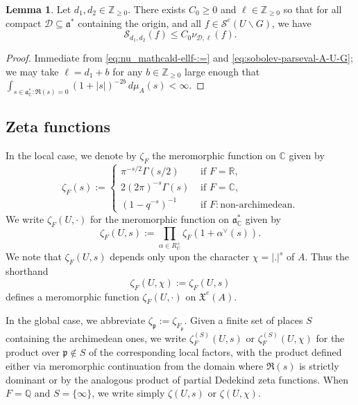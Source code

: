 \documentclass[reqno]{amsart}
\theoremstyle{plain} \newtheorem{theorem} {Theorem}
\theoremstyle{definition} \newtheorem{definition} [theorem] {Definition}
\theoremstyle{itplain} %
\newtheorem{lemma}[theorem]{Lemma}
\numberwithin{equation}{section}
\numberwithin{theorem}{section}
\renewcommand{\geq}{\geqslant}
\renewcommand{\leq}{\leqslant}
\begin{document}
\begin{lemma}\label{lem:standard2:let-d_1-d_2}
  Let $d_1, d_2 \in \mathbb{Z}_{\geq 0}$.  There exists $C_0 \geq 0$ and $\ell \in \mathbb{Z}_{\geq 0}$ so that for all compact $\mathcal{D} \subseteq \mathfrak{a}^*$ containing the origin, and all $f \in \mathcal{S}^e(U \backslash G)$, we have
  \begin{equation*}
    \mathcal{S}_{d_1,d_2}(f) \leq C_0 \nu_{\mathcal{D},\ell}(f).
  \end{equation*}
\end{lemma}
\begin{proof}
  Immediate from \eqref{eq:nu_mathcald-ellf-:=} and \eqref{eq:sobolev-parseval-A-U-G}; we may take $\ell = d_1 + b$ for any $b \in \mathbb{Z}_{\geq 0}$ large enough that $\int _{s \in \mathfrak{a}_{\mathbb{C}}^* : \Re(s) = 0} (1 + |s|)^{-2 b} \, d \mu_A(s) < \infty$.
\end{proof}


\subsection{Zeta functions}\label{sec:local-zeta-functions}
In the local case, we denote by $\zeta_F$ the meromorphic function on $\mathbb{C}$ given by 
\begin{equation*}
  \zeta_F(s) :=
  \begin{cases}
    \pi^{-s/2} \Gamma(s/2) & \text{ if } F = \mathbb{R}, \\
    2 (2 \pi ) ^{- s} \Gamma (s) &  \text{ if } F = \mathbb{C}, \\
    (1 - q^{-s})^{-1} & \text{ if } F: \text{non-archimedean}.
  \end{cases}
\end{equation*}
We write $\zeta_F(U,\cdot)$ for the meromorphic function on $\mathfrak{a}_{\mathbb{C}}^*$ given by
\begin{equation*}
  \zeta_F(U,s) := \prod_{\alpha \in R_U^+} \zeta_F(1 + \alpha^\vee(s)).
\end{equation*}
We note that $\zeta_F(U,s)$ depends only upon the character $\chi = |.|^s$ of $A$.  Thus the shorthand 
\begin{equation*}
  \zeta_F(U,\chi) := \zeta_F(U,s)
\end{equation*}
defines a meromorphic function $\zeta_F(U,\cdot)$ on $\mathfrak{X}^e(A)$.

In the global case, we abbreviate $\zeta_\mathfrak{p} := \zeta_{F_\mathfrak{p}}$.  Given a finite set of places $S$ containing the archimedean ones, we write $\zeta_F^{(S)}(U,s)$ or $\zeta_F^{(S)}(U,\chi)$ for the product over $\mathfrak{p} \notin S$  of the corresponding local factors, with the product defined either via meromorphic continuation from the domain where $\Re(s)$ is strictly dominant or by the analogous product of partial Dedekind zeta functions.  When $F = \mathbb{Q}$ and $S = \{\infty\}$, we write simply $\zeta(U,s)$ or $\zeta(U,\chi)$.
\end{document}
